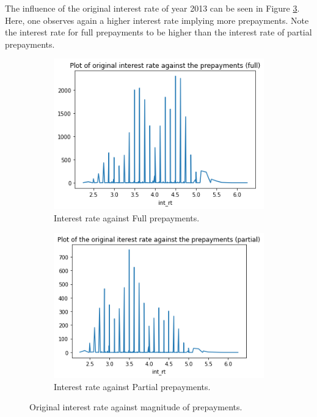         \noindent
        The influence of the original interest rate of year 2013 can be seen in Figure \ref{model_int_rt_against_prepayment}. Here, one observes again a higher interest rate implying more prepayments. Note the interest rate for full prepayments to be higher than the interest rate of partial prepayments. 
        \begin{figure}[H]
            \centering
            \begin{subfigure}{0.45\textwidth}
                \includegraphics[width=\linewidth]{Latex/Report/Figures/int_rt againts Full prepayments.png}
                \caption{Interest rate against Full prepayments.}
                \label{model_int_rt_against_full_prepayment}
            \end{subfigure}
            \begin{subfigure}{0.45\textwidth}
                \includegraphics[width=\linewidth]{Latex/Report/Figures/int_rt againts Partial prepayments.png}
                \caption{Interest rate against Partial prepayments.}
                \label{model_int_rt_against_partial_prepayment}
            \end{subfigure}
            \caption{Original interest rate against magnitude of prepayments.}
            \label{model_int_rt_against_prepayment}
        \end{figure}
        
